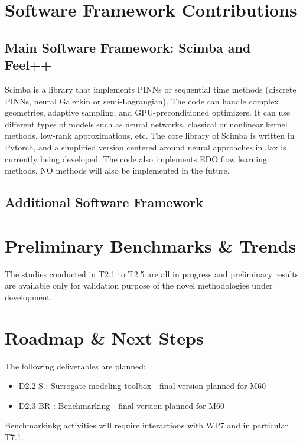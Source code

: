 \section{Software Framework Contributions}

\subsection{Main Software Framework: Scimba and Feel++}

Scimba is a  library that implements PINNs or  sequential time methods
(discrete PINNs,  neural Galerkin  or semi-Lagrangian).  The  code can
handle complex  geometries, adaptive sampling,  and GPU-preconditioned
optimizers.   It can  use different  types  of models  such as  neural
networks,   classical   or    nonlinear   kernel   methods,   low-rank
approximations,  etc.   The  core  library of  Scimba  is  written  in
Pytorch, and a simplified version centered around neural approaches in
Jax is  currently being developed.  The code also implements  EDO flow
learning methods.  NO methods will also be implemented in the future.

\subsection{Additional Software Framework}



\section{Preliminary Benchmarks \& Trends}

The  studies  conducted in  T2.1  to  T2.5  are  all in  progress  and
preliminary results are  available only for validation  purpose of the
novel methodologies under development. 

\section{Roadmap \& Next Steps}

The following deliverables are planned: 
\begin{itemize}
\item D2.2-S : Surrogate modeling toolbox - final version planned for M60
\item D2.3-BR : Benchmarking - final version planned for M60
\end{itemize}

Benchmarkinkg activities will require interactions with WP7 and in particular T7.1.
